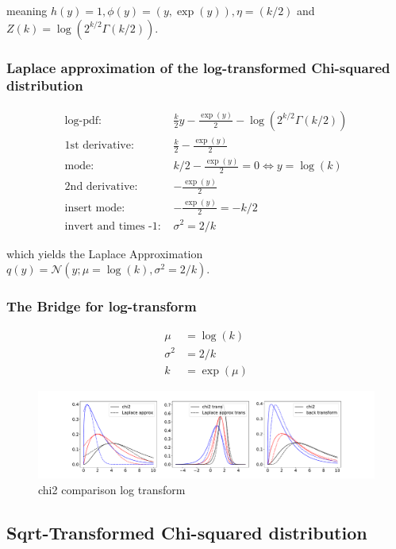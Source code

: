 meaning $h(y) = 1, \phi(y) =(y, \exp(y)), \eta=(k/2)$ and $Z(k) =  \log(2^{k/2}\Gamma(k/2))$. 

\subsubsection{Laplace approximation of the log-transformed Chi-squared distribution}

\begin{align*}
\text{log-pdf: } &\frac{k}{2}y - \frac{\exp(y)}{2} - \log(2^{k/2}\Gamma(k/2)) \\
\text{1st derivative: }&  \frac{k}{2} - \frac{\exp(y)}{2} \\
\text{mode: }& k/2 - \frac{\exp(y)}{2} = 0 \Leftrightarrow y = \log(k)\\
\text{2nd derivative: }&  -\frac{\exp(y)}{2}\\
\text{insert mode: }& -\frac{\exp(y)}{2} = -k/2\\
\text{invert and times -1: }&\sigma^2 = 2/k
\end{align*}

which yields the Laplace Approximation $q(y) = \mathcal{N}(y; \mu= \log(k), \sigma^2 = 2/k)$.

\subsubsection{The Bridge for log-transform}

\begin{align}
	\mu &= \log(k) \\
	\sigma^2 &= 2/k \\
	k &= \exp(\mu)
\end{align}

\begin{figure}[!htb]
	\centering
	\includegraphics[width=\textwidth]{figures/chi2_playground_log.pdf}
	\caption{chi2 comparison log transform}
	\label{fig:chi2_log_comparison}
\end{figure}

\subsection{Sqrt-Transformed Chi-squared distribution}

